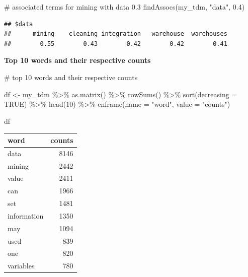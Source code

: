 \documentclass[
]{article}
\newenvironment{Shaded}{}{}
\newcommand{\AttributeTok}[1]{#1}
\newcommand{\CommentTok}[1]{\textcolor[rgb]{0.30,0.53,0.42}{#1}}
\newcommand{\ConstantTok}[1]{\textcolor[rgb]{0.35,0.36,0.96}{#1}}
\newcommand{\DecValTok}[1]{\textcolor[rgb]{0.00,0.00,0.80}{#1}}
\newcommand{\FloatTok}[1]{\textcolor[rgb]{0.00,0.00,0.80}{#1}}
\newcommand{\FunctionTok}[1]{#1}
\newcommand{\NormalTok}[1]{#1}
\newcommand{\OtherTok}[1]{\textcolor[rgb]{1.00,0.25,0.00}{#1}}
\newcommand{\SpecialCharTok}[1]{\textcolor[rgb]{0.00,0.50,0.50}{#1}}
\newcommand{\StringTok}[1]{\textcolor[rgb]{0.01,0.42,0.03}{#1}}
\begin{document}
\begin{Shaded}
\begin{Highlighting}[]
\CommentTok{\# associated terms for mining with data 0.3}
\FunctionTok{findAssocs}\NormalTok{(my\_tdm, }\StringTok{"data"}\NormalTok{, }\FloatTok{0.4}\NormalTok{)}
\end{Highlighting}
\end{Shaded}

\begin{verbatim}
## $data
##      mining    cleaning integration   warehouse  warehouses 
##        0.55        0.43        0.42        0.42        0.41
\end{verbatim}

\textbf{Top 10 words and their respective counts}

\begin{Shaded}
\begin{Highlighting}[]
\CommentTok{\# top 10 words and their respective counts }

\NormalTok{df }\OtherTok{\textless{}{-}}
\NormalTok{  my\_tdm }\SpecialCharTok{\%\textgreater{}\%}
  \FunctionTok{as.matrix}\NormalTok{() }\SpecialCharTok{\%\textgreater{}\%}
  \FunctionTok{rowSums}\NormalTok{() }\SpecialCharTok{\%\textgreater{}\%}
  \FunctionTok{sort}\NormalTok{(}\AttributeTok{decreasing =} \ConstantTok{TRUE}\NormalTok{) }\SpecialCharTok{\%\textgreater{}\%}
  \FunctionTok{head}\NormalTok{(}\DecValTok{10}\NormalTok{) }\SpecialCharTok{\%\textgreater{}\%}
  \FunctionTok{enframe}\NormalTok{(}\AttributeTok{name =} \StringTok{"word"}\NormalTok{, }\AttributeTok{value =} \StringTok{"counts"}\NormalTok{)}

\NormalTok{df}
\end{Highlighting}
\end{Shaded}

\begin{longtable}[]{@{}lr@{}}
\toprule\noalign{}
word & counts \\
\midrule\noalign{}
\endhead
\bottomrule\noalign{}
\endlastfoot
data & 8146 \\
mining & 2442 \\
value & 2411 \\
can & 1966 \\
set & 1481 \\
information & 1350 \\
may & 1094 \\
used & 839 \\
one & 820 \\
variables & 780 \\
\end{longtable}
\end{document}
